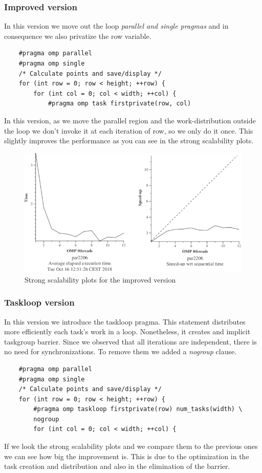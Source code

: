 \documentclass{article}
\begin{document}
\subsubsection*{Improved version}
In this version we move out the loop \textit{parallel and single pragmas} and in consequence we also privatize the row variable.

\begin{lstlisting}
    #pragma omp parallel
    #pragma omp single
    /* Calculate points and save/display */
    for (int row = 0; row < height; ++row) {
        for (int col = 0; col < width; ++col) {
            #pragma omp task firstprivate(row, col)

\end{lstlisting}
In this version, as we move the parallel region and the work-distribution outside the loop we don't invoke it at each iteration of row, so we only do it once. This slightly improves the performance as you can see in the strong scalability plots.
\begin{figure}[h]
    \centering
    \includegraphics[width=1\textwidth]{strongPoint2.png}
    \caption{Strong scalability plots for the improved version}
    \label{fig:strongpoint2}
\end{figure}

\subsubsection*{Taskloop version}   
\justify
In this version we introduce the taskloop pragma. This statement distributes more efficiently each task's work in a loop. Nonetheless, it creates and implicit taskgroup barrier. Since we observed that all iterations are independent, there is no need for synchronizations. To remove them we added a \textit{nogroup} clause.


\begin{lstlisting}
    #pragma omp parallel
    #pragma omp single
    /* Calculate points and save/display */
    for (int row = 0; row < height; ++row) {
        #pragma omp taskloop firstprivate(row) num_tasks(width) \
        nogroup
        for (int col = 0; col < width; ++col) {
\end{lstlisting}
\justify
If we look the strong scalability plots and we compare them to the previous ones we can see how big the improvement is. This is due to the optimization in the task creation and distribution and also in the elimination of the barrier.
\end{document}
